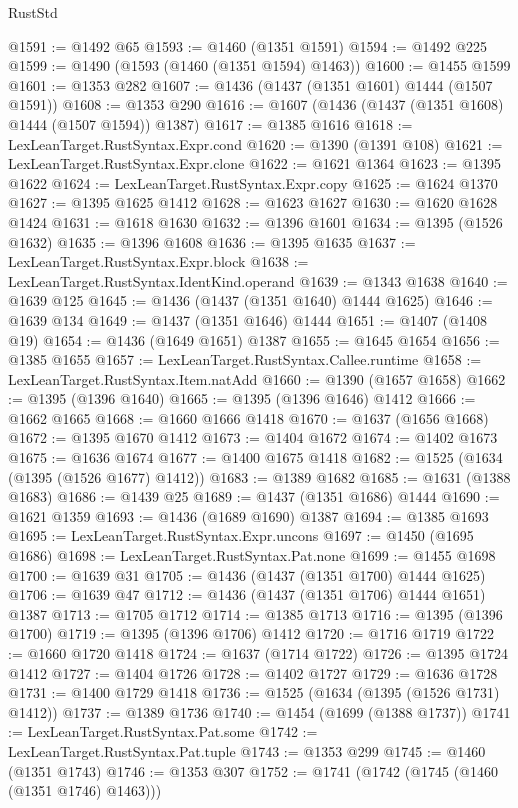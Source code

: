 \begin{lexlean}{RustStd}
\begin{coremodule}
@1591 := @1492 @65
@1593 := @1460 (@1351 @1591)
@1594 := @1492 @225
@1599 := @1490 (@1593 (@1460 (@1351 @1594) @1463))
@1600 := @1455 @1599
@1601 := @1353 @282
@1607 := @1436 (@1437 (@1351 @1601) @1444 (@1507 @1591))
@1608 := @1353 @290
@1616 := @1607 (@1436 (@1437 (@1351 @1608) @1444 (@1507 @1594)) @1387)
@1617 := @1385 @1616
@1618 := LexLeanTarget.RustSyntax.Expr.cond
@1620 := @1390 (@1391 @108)
@1621 := LexLeanTarget.RustSyntax.Expr.clone
@1622 := @1621 @1364
@1623 := @1395 @1622
@1624 := LexLeanTarget.RustSyntax.Expr.copy
@1625 := @1624 @1370
@1627 := @1395 @1625 @1412
@1628 := @1623 @1627
@1630 := @1620 @1628 @1424
@1631 := @1618 @1630
@1632 := @1396 @1601
@1634 := @1395 (@1526 @1632)
@1635 := @1396 @1608
@1636 := @1395 @1635
@1637 := LexLeanTarget.RustSyntax.Expr.block
@1638 := LexLeanTarget.RustSyntax.IdentKind.operand
@1639 := @1343 @1638
@1640 := @1639 @125
@1645 := @1436 (@1437 (@1351 @1640) @1444 @1625)
@1646 := @1639 @134
@1649 := @1437 (@1351 @1646) @1444
@1651 := @1407 (@1408 @19)
@1654 := @1436 (@1649 @1651) @1387
@1655 := @1645 @1654
@1656 := @1385 @1655
@1657 := LexLeanTarget.RustSyntax.Callee.runtime
@1658 := LexLeanTarget.RustSyntax.Item.natAdd
@1660 := @1390 (@1657 @1658)
@1662 := @1395 (@1396 @1640)
@1665 := @1395 (@1396 @1646) @1412
@1666 := @1662 @1665
@1668 := @1660 @1666 @1418
@1670 := @1637 (@1656 @1668)
@1672 := @1395 @1670 @1412
@1673 := @1404 @1672
@1674 := @1402 @1673
@1675 := @1636 @1674
@1677 := @1400 @1675 @1418
@1682 := @1525 (@1634 (@1395 (@1526 @1677) @1412))
@1683 := @1389 @1682
@1685 := @1631 (@1388 @1683)
@1686 := @1439 @25
@1689 := @1437 (@1351 @1686) @1444
@1690 := @1621 @1359
@1693 := @1436 (@1689 @1690) @1387
@1694 := @1385 @1693
@1695 := LexLeanTarget.RustSyntax.Expr.uncons
@1697 := @1450 (@1695 @1686)
@1698 := LexLeanTarget.RustSyntax.Pat.none
@1699 := @1455 @1698
@1700 := @1639 @31
@1705 := @1436 (@1437 (@1351 @1700) @1444 @1625)
@1706 := @1639 @47
@1712 := @1436 (@1437 (@1351 @1706) @1444 @1651) @1387
@1713 := @1705 @1712
@1714 := @1385 @1713
@1716 := @1395 (@1396 @1700)
@1719 := @1395 (@1396 @1706) @1412
@1720 := @1716 @1719
@1722 := @1660 @1720 @1418
@1724 := @1637 (@1714 @1722)
@1726 := @1395 @1724 @1412
@1727 := @1404 @1726
@1728 := @1402 @1727
@1729 := @1636 @1728
@1731 := @1400 @1729 @1418
@1736 := @1525 (@1634 (@1395 (@1526 @1731) @1412))
@1737 := @1389 @1736
@1740 := @1454 (@1699 (@1388 @1737))
@1741 := LexLeanTarget.RustSyntax.Pat.some
@1742 := LexLeanTarget.RustSyntax.Pat.tuple
@1743 := @1353 @299
@1745 := @1460 (@1351 @1743)
@1746 := @1353 @307
@1752 := @1741 (@1742 (@1745 (@1460 (@1351 @1746) @1463)))

\end{coremodule}
\end{lexlean}
